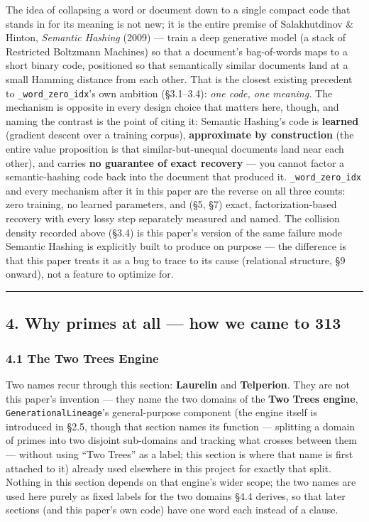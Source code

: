 \documentclass[
  10pt,
]{article}
\begin{document}
The idea of collapsing a word or document down to a single compact code
that stands in for its meaning is not new; it is the entire premise of
Salakhutdinov \& Hinton, \emph{Semantic Hashing} (2009) --- train a deep
generative model (a stack of Restricted Boltzmann Machines) so that a
document's bag-of-words maps to a short binary code, positioned so that
semantically similar documents land at a small Hamming distance from
each other. That is the closest existing precedent to
\texttt{\_word\_zero\_idx}'s own ambition (§3.1--3.4): \emph{one code,
one meaning.} The mechanism is opposite in every design choice that
matters here, though, and naming the contrast is the point of citing it:
Semantic Hashing's code is \textbf{learned} (gradient descent over a
training corpus), \textbf{approximate by construction} (the entire value
proposition is that similar-but-unequal documents land near each other),
and carries \textbf{no guarantee of exact recovery} --- you cannot
factor a semantic-hashing code back into the document that produced it.
\texttt{\_word\_zero\_idx} and every mechanism after it in this paper
are the reverse on all three counts: zero training, no learned
parameters, and (§5, §7) exact, factorization-based recovery with every
lossy step separately measured and named. The collision density recorded
above (§3.4) is this paper's version of the same failure mode Semantic
Hashing is explicitly built to produce on purpose --- the difference is
that this paper treats it as a bug to trace to its cause (relational
structure, §9 onward), not a feature to optimize for.

\begin{center}\rule{0.5\linewidth}{0.5pt}\end{center}

\hypertarget{why-primes-at-all-how-we-came-to-313}{%
\subsection{4. Why primes at all --- how we came to
313}\label{why-primes-at-all-how-we-came-to-313}}

\hypertarget{the-two-trees-engine}{%
\subsubsection{4.1 The Two Trees Engine}\label{the-two-trees-engine}}

Two names recur through this section: \textbf{Laurelin} and
\textbf{Telperion}. They are not this paper's invention --- they name
the two domains of the \textbf{Two Trees engine},
\texttt{GenerationalLineage}'s general-purpose component (the engine
itself is introduced in §2.5, though that section names its function ---
splitting a domain of primes into two disjoint sub-domains and tracking
what crosses between them --- without using ``Two Trees'' as a label;
this section is where that name is first attached to it) already used
elsewhere in this project for exactly that split. Nothing in this
section depends on that engine's wider scope; the two names are used
here purely as fixed labels for the two domains §4.4 derives, so that
later sections (and this paper's own code) have one word each instead of
a clause.
\end{document}
